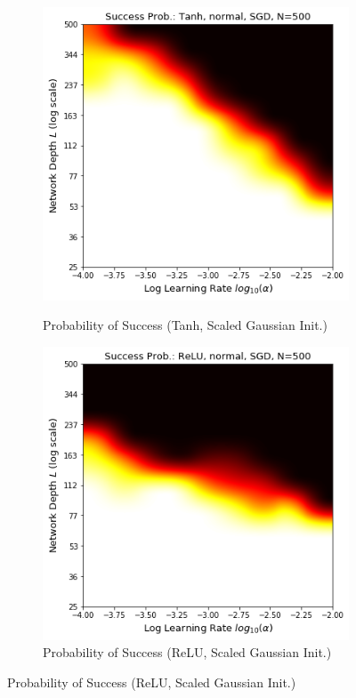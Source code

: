 \begin{figure}
\centering
\newcommand{\myWidth}{0.28\textwidth}
\newcommand{\myspace}{\hspace{3mm}}
\begin{subfigure}{\myWidth}
  \centering
  \caption{Probability of Success (Tanh, Scaled Gaussian Init.)}
  \includegraphics[width=1.0\linewidth,trim={0 0 0 0.65cm},clip]{"s_tanh_normal_sgd"}
  \label{fig:mnist_sim_s1}
\end{subfigure}\myspace%
\begin{subfigure}{\myWidth}
  \centering
  \caption{Probability of Success (ReLU, Scaled Gaussian Init.)}
  \includegraphics[width=1.0\linewidth,trim={0 0 0 0.65cm},clip]{"s_relu_normal_sgd"}

\end{subfigure}
\end{figure}
